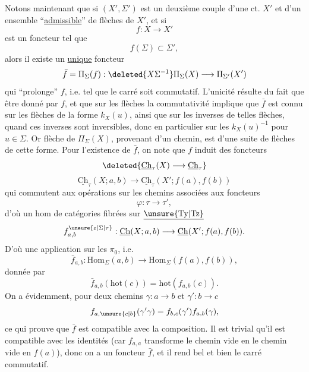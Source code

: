 Notons maintenant que si $(X',\Sigma')$ est un deuxième couple d'une ct. $X'$ et d'un ensemble ``\uline{admissible}'' de flèches de $X'$, et si
\[f:X\longrightarrow X'\]
est un foncteur tel que
\[f(\Sigma)\subset\Sigma',\]
alors il existe un \uline{unique} foncteur
\[\bar f=\Pi_\Sigma(f):\deleted{X\Sigma^{-1}}\Pi_\Sigma(X)\longrightarrow\Pi_{\Sigma'}(X')\]
qui ``prolonge'' $f$, i.e. tel que le carré
soit commutatif. L'unicité résulte du fait que  être donné par $f$, et que sur les flèches la commutativité  implique que $\bar f$ est connu sur les flèches de la forme $k_X(u)$, ainsi  que sur les inverses de telles flèches, quand ces inverses sont inversibles, donc en particulier sur les $k_X(u)^{-1}$ pour $u\in\Sigma$. Or  flèche de $\Pi_\Sigma(X)$, provenant d'un chemin, est  d'une suite de flèches de cette forme.
Pour l'existence de $\bar f$, on note que $f$ induit des foncteurs
\[\deleted{\underline{\mathrm{Ch}}_\tau(X)\longrightarrow\underline{\mathrm{Ch}}_\tau}\]
\[\underline{\mathrm{Ch}}_\tau(X;a,b)\longrightarrow\underline{\mathrm{Ch}}_\tau(X';f(a),f(b))\]
qui commutent aux opérations  sur les chemins associées aux foncteurs
\[\varphi:\tau\longrightarrow\tau',\]
d'où un hom de catégories fibrées sur $\underline{\unsure{\mathrm{Ty}|\mathrm{Tz}}}$
\[f_{a,b}^{\unsure{\varepsilon|\Sigma|\tau}}:\underline{\mathrm{Ch}}(X;a,b)\longrightarrow\underline{\mathrm{Ch}}(X';f(a),f(b)).\]
D'où une application sur les $\pi_0$, i.e.
\[\bar f_{a,b}:\mathrm{Hom}_\Sigma(a,b)\longrightarrow\mathrm{Hom}_\Sigma(f(a),f(b)),\]
donnée par
\[\bar f_{a,b}(\mathrm{hot}(c))=\mathrm{hot}(f_{a,b}(c)).\]
On a évidemment, pour deux chemins $\gamma:a\longrightarrow b$ et $\gamma':b\longrightarrow c$
\[f_{a,\unsure{c|b}}(\gamma'\gamma)=f_{b,c}(\gamma')f_{a,b}(\gamma),\]
ce qui prouve que $\bar f$ est compatible avec la composition. Il est trivial qu'il est compatible avec les identités (car $f_{a,a}$ transforme le chemin vide  en le chemin vide en $f(a)$), donc on a un foncteur $\bar f$, et il rend bel et bien le carré commutatif.

